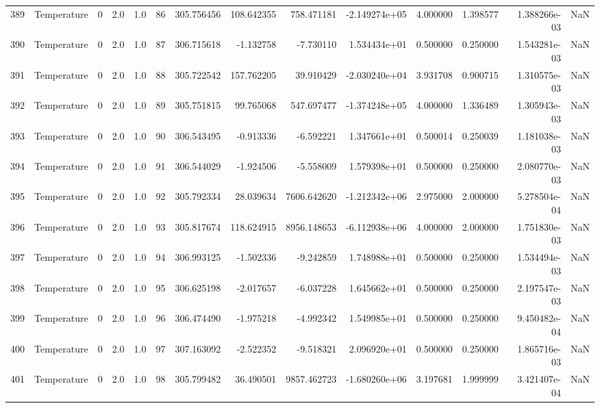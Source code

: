 \begin{tabular}{llrrrrrrrrrrrr}
389 &  Temperature &       0 &  2.0 &  1.0 &   86 &  305.756456 &   108.642355 &     758.471181 & -2.149274e+05 &  4.000000 &  1.398577 &  1.388266e-03 &      NaN \\
390 &  Temperature &       0 &  2.0 &  1.0 &   87 &  306.715618 &    -1.132758 &      -7.730110 &  1.534434e+01 &  0.500000 &  0.250000 &  1.543281e-03 &      NaN \\
391 &  Temperature &       0 &  2.0 &  1.0 &   88 &  305.722542 &   157.762205 &      39.910429 & -2.030240e+04 &  3.931708 &  0.900715 &  1.310575e-03 &      NaN \\
392 &  Temperature &       0 &  2.0 &  1.0 &   89 &  305.751815 &    99.765068 &     547.697477 & -1.374248e+05 &  4.000000 &  1.336489 &  1.305943e-03 &      NaN \\
393 &  Temperature &       0 &  2.0 &  1.0 &   90 &  306.543495 &    -0.913336 &      -6.592221 &  1.347661e+01 &  0.500014 &  0.250039 &  1.181038e-03 &      NaN \\
394 &  Temperature &       0 &  2.0 &  1.0 &   91 &  306.544029 &    -1.924506 &      -5.558009 &  1.579398e+01 &  0.500000 &  0.250000 &  2.080770e-03 &      NaN \\
395 &  Temperature &       0 &  2.0 &  1.0 &   92 &  305.792334 &    28.039634 &    7606.642620 & -1.212342e+06 &  2.975000 &  2.000000 &  5.278504e-04 &      NaN \\
396 &  Temperature &       0 &  2.0 &  1.0 &   93 &  305.817674 &   118.624915 &    8956.148653 & -6.112938e+06 &  4.000000 &  2.000000 &  1.751830e-03 &      NaN \\
397 &  Temperature &       0 &  2.0 &  1.0 &   94 &  306.993125 &    -1.502336 &      -9.242859 &  1.748988e+01 &  0.500000 &  0.250000 &  1.534494e-03 &      NaN \\
398 &  Temperature &       0 &  2.0 &  1.0 &   95 &  306.625198 &    -2.017657 &      -6.037228 &  1.645662e+01 &  0.500000 &  0.250000 &  2.197547e-03 &      NaN \\
399 &  Temperature &       0 &  2.0 &  1.0 &   96 &  306.474490 &    -1.975218 &      -4.992342 &  1.549985e+01 &  0.500000 &  0.250000 &  9.450482e-04 &      NaN \\
400 &  Temperature &       0 &  2.0 &  1.0 &   97 &  307.163092 &    -2.522352 &      -9.518321 &  2.096920e+01 &  0.500000 &  0.250000 &  1.865716e-03 &      NaN \\
401 &  Temperature &       0 &  2.0 &  1.0 &   98 &  305.799482 &    36.490501 &    9857.462723 & -1.680260e+06 &  3.197681 &  1.999999 &  3.421407e-04 &      NaN \\

\end{tabular}
